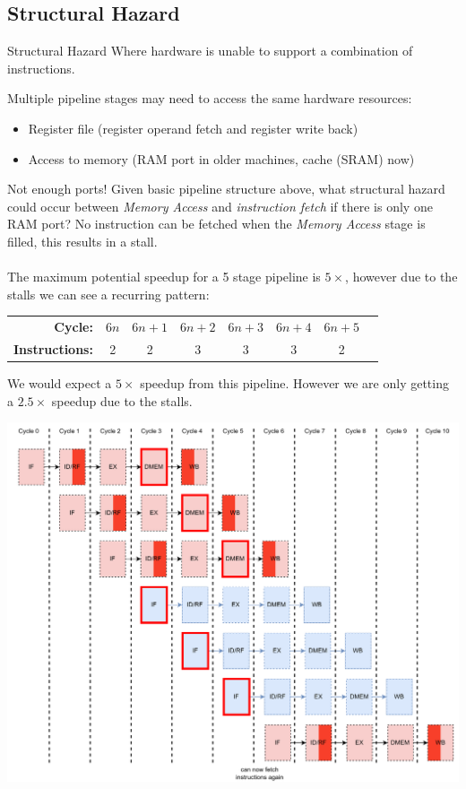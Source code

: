 \subsection{Structural Hazard}
\begin{definitionbox}{Structural Hazard}
    Where hardware is unable to support a combination of instructions.
\end{definitionbox}
Multiple pipeline stages may need to access the same hardware resources:
\begin{itemize}
    \item Register file (register operand fetch and register write back)
    \item Access to memory (RAM port in older machines, cache (SRAM) now)
\end{itemize}
\begin{examplebox}{Not enough ports!}
    Given basic pipeline structure above, what structural hazard could occur between \textit{Memory Access} and \textit{instruction fetch} if there is only one RAM port?
    \tcblower
    No instruction can be fetched when the \textit{Memory Access} stage is filled, this results in a stall. 
    \\
    \\ The maximum potential speedup for a 5 stage pipeline is $5\times$, however due to the stalls we can see a recurring pattern:
    \begin{center}
        \begin{tabular}{r c c c c c c c}
            \textbf{Cycle:} & $6n$ & $6n+1$ & $6n+2$ & $6n+3$ & $6n+4$ & $6n+5$ \\
            \textbf{Instructions:} & 2 & 2 & 3 & 3 & 3 & 2 \\
        \end{tabular}
    \end{center}
    We would expect a $5\times$ speedup from this pipeline. However we are only getting a $2.5\times$ speedup due to the stalls.

    \begin{center}
        \includegraphics[width=\textwidth]{pipelining/images/example_structural_hazard.drawio.png}
    \end{center}
\end{examplebox}

